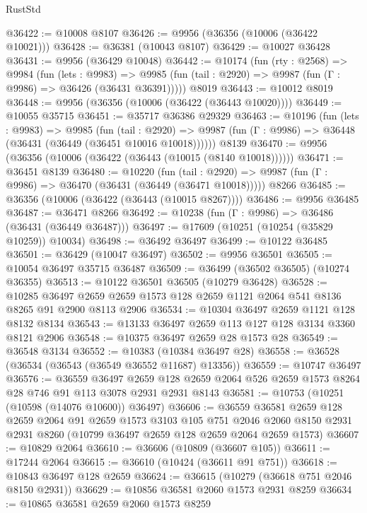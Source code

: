 \begin{lexlean}{RustStd}
\begin{coremodule}
@36422 := @10008 @8107
@36426 := @9956 (@36356 (@10006 (@36422 @10021)))
@36428 := @36381 (@10043 @8107)
@36429 := @10027 @36428
@36431 := @9956 (@36429 @10048)
@36442 := @10174
    (fun (rty : @2568) =>
    @9984
      (fun (lets : @9983) =>
      @9985 (fun (tail : @2920) => @9987 (fun (Γ : @9986) => @36426 (@36431 @36391)))))
    @8019
@36443 := @10012 @8019
@36448 := @9956 (@36356 (@10006 (@36422 (@36443 @10020))))
@36449 := @10055 @35715
@36451 := @35717 @36386 @29329
@36463 := @10196
    (fun (lets : @9983) =>
    @9985
      (fun (tail : @2920) =>
      @9987 (fun (Γ : @9986) => @36448 (@36431 (@36449 (@36451 @10016 @10018))))))
    @8139
@36470 := @9956 (@36356 (@10006 (@36422 (@36443 (@10015 (@8140 @10018))))))
@36471 := @36451 @8139
@36480 := @10220
    (fun (tail : @2920) => @9987 (fun (Γ : @9986) => @36470 (@36431 (@36449 (@36471 @10018)))))
    @8266
@36485 := @36356 (@10006 (@36422 (@36443 (@10015 @8267))))
@36486 := @9956 @36485
@36487 := @36471 @8266
@36492 := @10238 (fun (Γ : @9986) => @36486 (@36431 (@36449 @36487)))
@36497 := @17609 (@10251 (@10254 (@35829 @10259)) @10034)
@36498 := @36492 @36497
@36499 := @10122 @36485
@36501 := @36429 (@10047 @36497)
@36502 := @9956 @36501
@36505 := @10054 @36497 @35715 @36487
@36509 := @36499 (@36502 @36505) (@10274 @36355)
@36513 := @10122 @36501 @36505 (@10279 @36428)
@36528 := @10285
    @36497
    @2659
    @2659
    @1573
    @128
    @2659
    @1121
    @2064
    @541
    @8136
    @8265
    @91
    @2900
    @8113
    @2906
@36534 := @10304 @36497 @2659 @1121 @128 @8132 @8134
@36543 := @13133 @36497 @2659 @113 @127 @128 @3134 @3360 @8121 @2906
@36548 := @10375 @36497 @2659 @28 @1573 @28
@36549 := @36548 @3134
@36552 := @10383 (@10384 @36497 @28)
@36558 := @36528 (@36534 (@36543 (@36549 @36552 @11687) @13356))
@36559 := @10747 @36497
@36576 := @36559
    @36497
    @2659
    @128
    @2659
    @2064
    @526
    @2659
    @1573
    @8264
    @28
    @746
    @91
    @113
    @3078
    @2931
    @2931
    @8143
@36581 := @10753 (@10251 (@10598 (@14076 @10600)) @36497)
@36606 := @36559
    @36581
    @2659
    @128
    @2659
    @2064
    @91
    @2659
    @1573
    @3103
    @105
    @751
    @2046
    @2060
    @8150
    @2931
    @2931
    @8260
    (@10799 @36497 @2659 @128 @2659 @2064 @2659 @1573)
@36607 := @10829 @2064
@36610 := @36606 (@10809 (@36607 @105))
@36611 := @17244 @2064
@36615 := @36610 (@10424 (@36611 @91 @751))
@36618 := @10843 @36497 @128 @2659
@36624 := @36615 (@10279 (@36618 @751 @2046 @8150 @2931))
@36629 := @10856 @36581 @2060 @1573 @2931 @8259
@36634 := @10865 @36581 @2659 @2060 @1573 @8259

\end{coremodule}
\end{lexlean}
